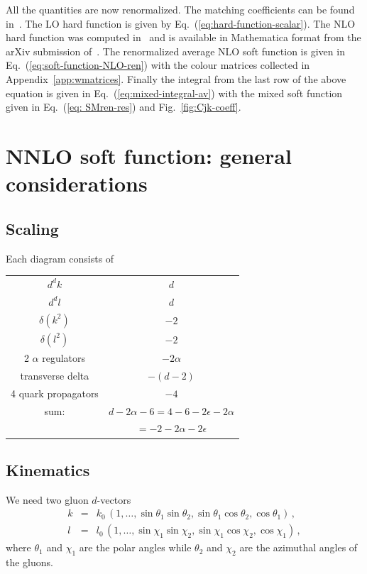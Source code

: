 \documentclass[a4paper,11pt]{report}
\numberwithin{equation}{section}
\begin{document}
All the quantities are now renormalized.
%
The matching coefficients can be found in~\cite{AntoniaMTh, Becher:2012yn}. The
LO hard function is given by Eq.~(\ref{eq:hard-function-scalar}). The NLO hard
function was computed in~\cite{Ahrens:2011px} and is available in Mathematica
format from the arXiv submission of~\cite{Li:2013mia}.
%
The renormalized average NLO
soft function is given in Eq.~(\ref{eq:soft-function-NLO-ren}) with the colour
matrices collected in Appendix~\ref{app:wmatrices}.
%
Finally the integral from
the last row of the above equation is given in Eq.~(\ref{eq:mixed-integral-av}) with the mixed soft
function given in Eq.~(\ref{eq: SMren-res}) and Fig.~\ref{fig:Cjk-coeff}.



\chapter{NNLO soft function: general considerations}

\section{Scaling}

Each diagram consists of 


\begin{center}
  {\renewcommand{\arraystretch}{1.0}%
    \begin{tabular}{cc}
    $d^dk$ & $d$ \\
    $d^dl$ & $d$ \\
    $\delta(k^2)$ & $-2$ \\
    $\delta(l^2)$ & $-2$ \\
    2 $\alpha$ regulators & $-2\alpha$ \\
    transverse delta & $-(d-2)$ \\
    4 quark propagators & $-4$\\
    \hline
    sum: & $d -2 \alpha - 6 = 4-6-2\epsilon - 2\alpha$ \\
         & \hspace{40pt} $= -2 -2\alpha -2\epsilon$
    \end{tabular}
  }
\end{center}

\section{Kinematics}
We need two gluon $d$-vectors
%
\begin{eqnarray}
  k & = & k_{0}\, (1,\ldots,\sin\theta_1\sin\theta_2,
               \sin\theta_1\cos\theta_2,\cos\theta_1)\,, \\
  l & = & l_{0}\, (1,\ldots,\sin\chi_1\sin\chi_2,
               \sin\chi_1\cos\chi_2,\cos\chi_1)\,,
\end{eqnarray}
%
where $\theta_1$ and $\chi_1$ are the polar angles while $\theta_2$ and $\chi_2$
are the azimuthal angles of the gluons.
 
\end{document}
